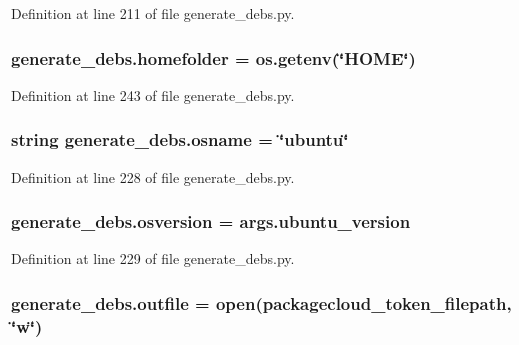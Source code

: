 Definition at line 211 of file generate\+\_\+debs.\+py.

\subsubsection[{\texorpdfstring{homefolder}{homefolder}}]{\setlength{\rightskip}{0pt plus 5cm}generate\+\_\+debs.\+homefolder = os.\+getenv(\char`\"{}H\+O\+ME\char`\"{})}\hypertarget{namespacegenerate__debs_aeb83979be2939a8059435a906a91f682}{}\label{namespacegenerate__debs_aeb83979be2939a8059435a906a91f682}


Definition at line 243 of file generate\+\_\+debs.\+py.

\subsubsection[{\texorpdfstring{osname}{osname}}]{\setlength{\rightskip}{0pt plus 5cm}string generate\+\_\+debs.\+osname = \char`\"{}ubuntu\char`\"{}}\hypertarget{namespacegenerate__debs_ad06322332de29cb27a40152d0cccc2ca}{}\label{namespacegenerate__debs_ad06322332de29cb27a40152d0cccc2ca}


Definition at line 228 of file generate\+\_\+debs.\+py.

\subsubsection[{\texorpdfstring{osversion}{osversion}}]{\setlength{\rightskip}{0pt plus 5cm}generate\+\_\+debs.\+osversion = args.\+ubuntu\+\_\+version}\hypertarget{namespacegenerate__debs_afd02fe6ead63bc5db5d3c3b9eb973b62}{}\label{namespacegenerate__debs_afd02fe6ead63bc5db5d3c3b9eb973b62}


Definition at line 229 of file generate\+\_\+debs.\+py.

\subsubsection[{\texorpdfstring{outfile}{outfile}}]{\setlength{\rightskip}{0pt plus 5cm}generate\+\_\+debs.\+outfile = open({\bf packagecloud\+\_\+token\+\_\+filepath}, \char`\"{}w\char`\"{})}\hypertarget{namespacegenerate__debs_aa1faa039b35b72ee44dc6f106ad12911}{}\label{namespacegenerate__debs_aa1faa039b35b72ee44dc6f106ad12911}


